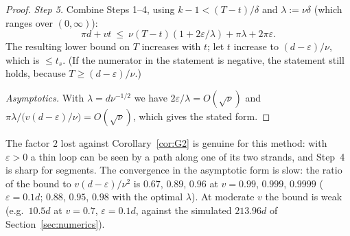 \begin{proof}
\emph{Step 5.} Combine Steps 1--4, using $k-1<(T-t)/\delta$ and $\lambda:=\nu\delta$ (which ranges over $(0,\infty)$):
\[
\pi d+vt\ \le\ \nu(T-t)(1+2\varepsilon/\lambda)+\pi\lambda+2\pi\varepsilon .
\]
The resulting lower bound on $T$ increases with $t$; let $t$ increase to $(d-\varepsilon)/\nu$, which is $\le t_s$. (If the numerator in
the statement is negative, the statement still holds, because $T\ge(d-\varepsilon)/\nu$.)

\emph{Asymptotics.} With $\lambda=d\nu^{-1/2}$ we have $2\varepsilon/\lambda=O(\sqrt\nu)$ and $\pi\lambda\big/\bigl(v(d-\varepsilon)/\nu\bigr)=O(\sqrt\nu)$, which gives
the stated form.
\end{proof}

\begin{remark}
The factor $2$ lost against Corollary~\ref{cor:G2} is genuine for this method: with $\varepsilon>0$ a thin loop can be seen by a path
along one of its two strands, and Step~4 is sharp for segments. The convergence in the asymptotic form is slow: the ratio of the
bound to $v(d-\varepsilon)/\nu^2$ is $0.67$, $0.89$, $0.96$ at $v=0.99$, $0.999$, $0.9999$ ($\varepsilon=0.1d$; $0.88$, $0.95$, $0.98$
with the optimal $\lambda$). At moderate $v$ the bound is weak (e.g.\ $10.5d$ at $v=0.7$, $\varepsilon=0.1d$, against the simulated
$213.96d$ of Section~\ref{sec:numerics}).
\end{remark}

